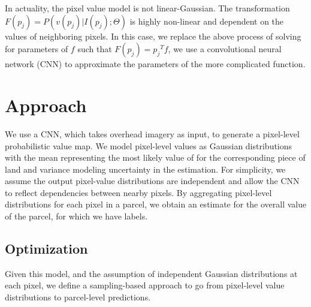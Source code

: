 \documentclass[10pt,twocolumn,letterpaper]{article}
\begin{document}
In actuality, the pixel value model is not linear-Gaussian. The transformation $F(p_j) = P(v(p_j)|I(p_j); \Theta)$ is highly non-linear and dependent on the values of neighboring pixels. In this case, we replace the above process of solving for parameters of $f$ such that $F(p_j)={p_j}^T f$, we use a convolutional neural network (CNN) to approximate the parameters of the more complicated function.



\section{Approach}

We use a CNN, which takes overhead imagery as input, to generate a pixel-level probabilistic value map. We model pixel-level values as Gaussian distributions with the mean representing the most likely value of for the corresponding piece of land and variance modeling uncertainty in the estimation. For simplicity, we assume the output pixel-value distributions are independent and allow the CNN to reflect dependencies between nearby pixels. By aggregating pixel-level distributions for each pixel in a parcel, we obtain an estimate for the overall value of the parcel, for which we have labels.

\subsection{Optimization}

Given this model, and the assumption of independent Gaussian distributions at each pixel, we define a sampling-based approach to go from pixel-level value distributions to parcel-level predictions.
\end{document}
